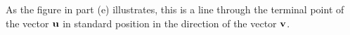 \begin{activitySolution}
\begin{center}
      \end{center}
     \item As the figure in part (e) illustrates, this is a line through the terminal point of the vector $\mathbf{u}$ in standard position in the direction of the vector $\mathbf{v}$. 
	\ea
\end{activitySolution}
\aftera

